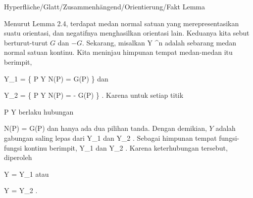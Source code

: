 {Hyperfläche/Glatt/Zusammenhängend/Orientierung/Fakt}
{Lemma}
{}
{

\faktzusatz {}
\faktzusatz {}

}
{

Menurut
Lemma 2.4,
terdapat medan normal satuan yang merepresentasikan suatu orientasi, dan negatifnya menghasilkan orientasi lain. Keduanya kita sebut berturut-turut $G$ dan $-G$. Sekarang, misalkan
 { Y } { \R^n
} {}
adalah sebarang medan normal satuan kontinu. Kita meninjau himpunan tempat medan-medan itu berimpit,

\mavergleichskettedisp
{\vergleichskette
{ Y_1
}
{ =} { \left\{ P \in Y  \mid   N(P) = G(P)         \right\}
}
{ } {
}
{ } {
}
{ } {
}
}
{}{}{}
dan

\mavergleichskettedisp
{\vergleichskette
{ Y_2
}
{ =} { \left\{ P \in Y  \mid   N(P) = - G(P)         \right\}
}
{ } {
}
{ } {
}
{ } {
}
}
{}{}{.}
Karena untuk setiap titik

\mavergleichskette
{\vergleichskette
{ P
}
{ \in }{ Y
}
{  }{
}
{    }{
}
{   }{
}
}
{}{}{}
berlaku hubungan

\mavergleichskettedisp
{\vergleichskette
{ N(P)
}
{ =} { \pm G(P)
}
{ } {
}
{ } {
}
{ } {
}
}
{}{}{}
dan hanya ada dua pilihan tanda. Dengan demikian, $Y$ adalah gabungan saling lepas dari
\mathkor {} {Y_1} {dan} {Y_2} {.}
Sebagai himpunan tempat fungsi-fungsi kontinu berimpit,
\mathkor {} {Y_1} {dan} {Y_2} {}
 {} {.}
Karena keterhubungan tersebut, diperoleh

\mavergleichskette
{\vergleichskette
{ Y
}
{ = }{ Y_1
}
{  }{
}
{    }{
}
{   }{
}
}
{}{}{}
atau

\mavergleichskette
{\vergleichskette
{ Y
}
{ = }{ Y_2
}
{  }{
}
{    }{
}
{   }{
}
}
{}{}{.}

}

